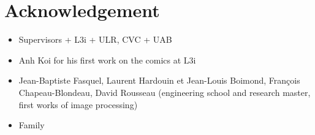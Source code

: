 \chapter*{Acknowledgement}
\begin{itemize}
	\item Supervisors + L3i + ULR, CVC + UAB
	\item Anh Koi for his first work on the comics at L3i
	\item Jean-Baptiste Fasquel, Laurent Hardouin et Jean-Louis Boimond, François Chapeau-Blondeau, David Rousseau (engineering school and research master, first works of image processing)
	\item Family
\end{itemize}
\clearpage\thispagestyle{empty}